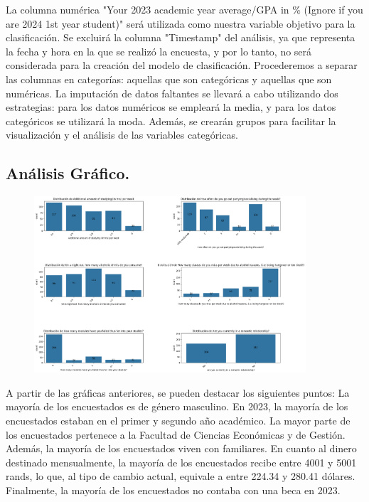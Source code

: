 \documentclass[a4paper,12pt]{article}
\begin{document}
La columna numérica "Your 2023 academic year average/GPA in \% (Ignore if you are 2024 1st year student)" será utilizada como nuestra variable objetivo para la clasificación. Se excluirá la columna "Timestamp" del análisis, ya que representa la fecha y hora en la que se realizó la encuesta, y por lo tanto, no será considerada para la creación del modelo de clasificación. Procederemos a separar las columnas en categorías: aquellas que son categóricas y aquellas que son numéricas. La imputación de datos faltantes se llevará a cabo utilizando dos estrategias: para los datos numéricos se empleará la media, y para los datos categóricos se utilizará la moda. Además, se crearán grupos para facilitar la visualización y el análisis de las variables categóricas.

\subsection{Análisis Gráfico.}

\begin{figure}[H]
  \centering
  \includegraphics[width=0.9\textwidth]{output1.png}
\end{figure}

A partir de las gráficas anteriores, se pueden destacar los siguientes puntos: La mayoría de los encuestados es de género masculino. En 2023, la mayoría de los encuestados estaban en el primer y segundo año académico. La mayor parte de los encuestados pertenece a la Facultad de Ciencias Económicas y de Gestión. Además, la mayoría de los encuestados viven con familiares. En cuanto al dinero destinado mensualmente, la mayoría de los encuestados recibe entre 4001 y 5001 rands, lo que, al tipo de cambio actual, equivale a entre 224.34 y 280.41 dólares. Finalmente, la mayoría de los encuestados no contaba con una beca en 2023.
\end{document}
